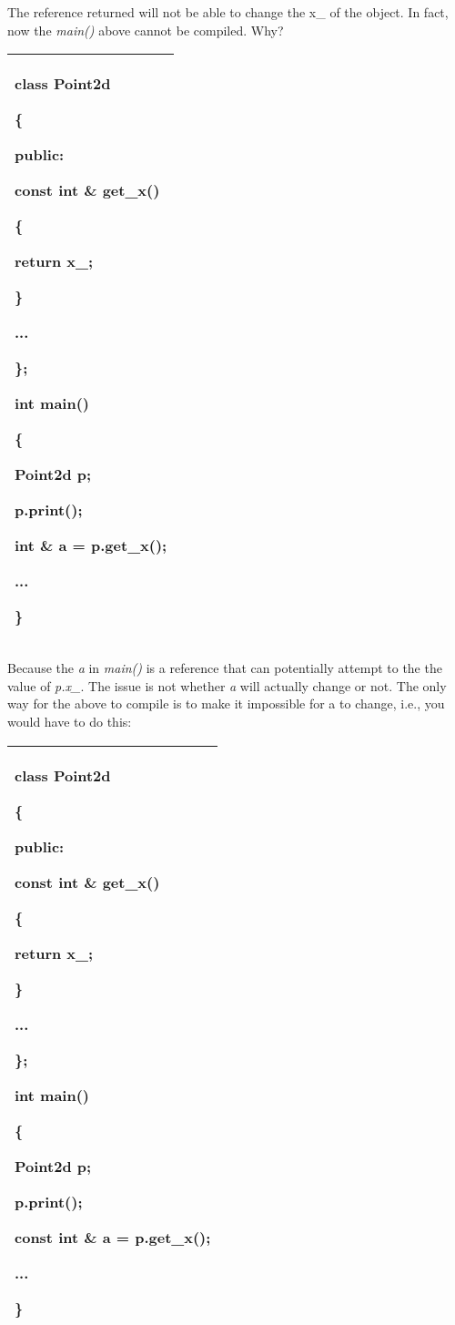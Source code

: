 \documentclass[
]{article}
\begin{document}
The reference returned will not be able to change the x\_ of the object.
In fact, now the \emph{main()} above cannot be compiled. Why?

\begin{longtable}[]{@{}l@{}}
\toprule
\endhead
\begin{minipage}[t]{0.97\columnwidth}\raggedright
class Point2d

\{

public:

const int \& get\_x()

\{

return x\_;

\}

...

\};

int main()

\{

Point2d p;

p.print();

int \& a = p.get\_x();

...

\}\strut
\end{minipage}\tabularnewline
\bottomrule
\end{longtable}

Because the \emph{a} in \emph{main()} is a reference that can
potentially attempt to the the value of \emph{p.x\_}. The issue is not
whether \emph{a} will actually change or not. The only way for the above
to compile is to make it impossible for a to change, i.e., you would
have to do this:

\begin{longtable}[]{@{}l@{}}
\toprule
\endhead
\begin{minipage}[t]{0.97\columnwidth}\raggedright
class Point2d

\{

public:

const int \& get\_x()

\{

return x\_;

\}

...

\};

int main()

\{

Point2d p;

p.print();

\textbf{const} int \& a = p.get\_x();

...

\}\strut
\end{minipage}\tabularnewline
\bottomrule
\end{longtable}
\end{document}
